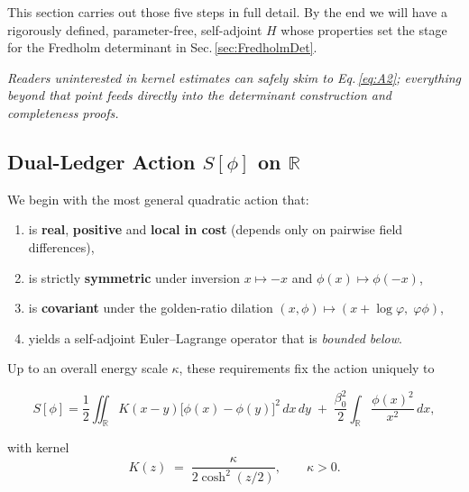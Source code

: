 \documentclass[11pt]{article}
\begin{document}
This section carries out those five steps in full detail.  By the end
we will have a rigorously defined, parameter-free, self-adjoint \(H\)
whose properties set the stage for the Fredholm determinant in
Sec.\,\ref{sec:FredholmDet}.

\bigskip
\noindent
\emph{Readers uninterested in kernel estimates can safely skim to
Eq.\,\eqref{eq:A2}; everything beyond that point feeds directly into
the determinant construction and completeness proofs.}

\subsection{Dual-Ledger Action $S[\phi]$ on $\mathbb R$}
\label{sec:LedgerActionDef}

We begin with the most general quadratic action that:

\begin{enumerate}
\item is \textbf{real}, \textbf{positive} and \textbf{local in cost}
      (depends only on pairwise field differences),
\item is strictly \textbf{symmetric} under inversion
      $x\mapsto-x$ and
      $\phi(x)\mapsto\phi(-x)$,
\item is \textbf{covariant} under the golden-ratio dilation
      $(x,\phi)\mapsto(x+\log\varphi,\;\varphi\phi)$,
\item yields a self-adjoint Euler–Lagrange operator that is
      \emph{bounded below}.
\end{enumerate}
Up to an overall energy scale $\kappa$, these requirements fix the
action uniquely to

\begin{equation}
\label{eq:A1}
S[\phi]
=\frac12\iint_{\mathbb R}
     K(x-y)\bigl[\phi(x)-\phi(y)\bigr]^{2}\,dx\,dy
 \;+\;
 \frac{\beta_{0}^{2}}{2}\int_{\mathbb R}\frac{\phi(x)^{2}}{x^{2}}\,dx,
\end{equation}

\noindent
with kernel
\begin{equation}
\label{eq:Kernel}
   K(z)\;=\;\frac{\kappa}{2\cosh^{2}(z/2)}, 
   \qquad \kappa>0.
\end{equation}
\end{document}
